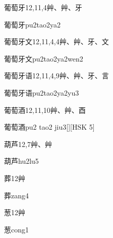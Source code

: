 \begin{entry}{葡萄牙}{12,11,4}{⾋、⾋、⽛}
  \begin{phonetics}{葡萄牙}{pu2tao2ya2}
  \end{phonetics}
\end{entry}

\begin{entry}{葡萄牙文}{12,11,4,4}{⾋、⾋、⽛、⽂}
  \begin{phonetics}{葡萄牙文}{pu2tao2ya2wen2}
  \end{phonetics}
\end{entry}

\begin{entry}{葡萄牙语}{12,11,4,9}{⾋、⾋、⽛、⾔}
  \begin{phonetics}{葡萄牙语}{pu2tao2ya2yu3}
  \end{phonetics}
\end{entry}

\begin{entry}{葡萄酒}{12,11,10}{⾋、⾋、⾣}
  \begin{phonetics}{葡萄酒}{pu2 tao2 jiu3}[][HSK 5]
  \end{phonetics}
\end{entry}

\begin{entry}{葫芦}{12,7}{⾋、⾋}
  \begin{phonetics}{葫芦}{hu2lu5}
  \end{phonetics}
\end{entry}

\begin{entry}{葬}{12}{⾋}
  \begin{phonetics}{葬}{zang4}
  \end{phonetics}
\end{entry}

\begin{entry}{葱}{12}{⾋}
  \begin{phonetics}{葱}{cong1}
  \end{phonetics}
\end{entry}

